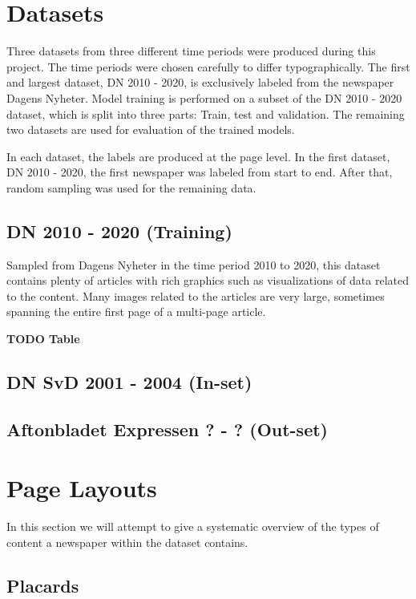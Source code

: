 \documentclass[english, bibtex]{kththesis}
\begin{document}
\section{Datasets}

Three datasets from three different time periods were produced during this project. The time periods were chosen carefully to differ typographically. The first and largest dataset, DN 2010 - 2020,  is exclusively labeled from the newspaper Dagens Nyheter. Model training is performed on a subset of the DN 2010 - 2020 dataset, which is split into three parts: Train, test and validation. The remaining two datasets are used for evaluation of the trained models.

In each dataset, the labels are produced at the page level. In the first dataset, DN 2010 - 2020, the first newspaper was labeled from start to end. After that, random sampling was used for the remaining data. 


\subsection{DN 2010 - 2020 (Training)}

Sampled from Dagens Nyheter in the time period 2010 to 2020, this dataset contains plenty of articles with rich graphics such as visualizations of data related to the content. Many images related to the articles are very large, sometimes spanning the entire first page of a multi-page article. 

\textbf{TODO Table}

\subsection{DN SvD 2001 - 2004 (In-set)}

\subsection{Aftonbladet Expressen ? - ? (Out-set)}


\section{Page Layouts}

In this section we will attempt to give a systematic overview of the types of content a newspaper within the dataset contains. 

\subsection{Placards}
\end{document}
